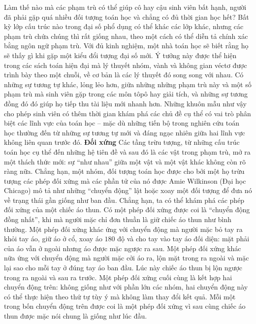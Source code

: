 \begin{multicols}{2}
	\vskip 0.1cm
	Làm thế nào mà các phạm trù có thể giúp cô hay cậu sinh viên bất hạnh, người đã phải gặp quá nhiều đối tượng toán học và chẳng có đủ thời gian học hết? Bất kỳ lớp cấu trúc nào trong đại số phổ dụng có thể khác các lớp khác, nhưng các phạm trù chứa chúng thì rất giống nhau, theo một cách có thể diễn tả chính xác bằng ngôn ngữ phạm trù.
	\vskip 0.1cm
	Với đủ kinh nghiệm, một nhà toán học sẽ biết rằng họ sẽ thấy gì khi gặp một kiểu đổi tượng đại số mới. Ý tưởng này được thể hiện trong các sách toán hiện đại mà lý thuyết nhóm, vành và không gian véctơ được trình bày theo một chuỗi, về cơ bản là các lý thuyết đó song song với nhau. Có những sự tương tự khác, lỏng lẻo hơn, giữa những những phạm trù này và một số phạm trù mà sinh viên gặp trong các môn tôpô hay giải tích, và những sự tương đồng đó đó giúp họ tiếp thu tài liệu mới nhanh hơn. Những khuôn mẫu như vậy cho phép sinh viên có thêm thời gian khám phá các chủ đề cụ thể có vai trò phân biệt các lĩnh vực của toán học -- mặc dù những tiến bộ trong nghiên cứu toán học thường đến từ những sự tương tự mới và đáng ngạc nhiên giữa hai lĩnh vực không liên quan trước đó.
	\vskip 0.1cm
	\textbf{\color{duongvaotoanhoc}Đối xứng}
	\vskip 0.1cm
	Các tầng trừu tượng, từ những cấu trúc toán học cụ thể đến những hệ tiên đề và sau đó là các vật trong phạm trù, mở ra một thách thức mới: sự ``như nhau'' giữa một vật và một vật khác không còn rõ ràng nữa. Chẳng hạn, một nhóm, đối tượng toán học được cho bởi một họ trừu tượng các phép đối xứng mà các phần tử của nó được Amie Wilkinson (Đại học Chicago) mô tả như những ``chuyển động'' lật hoặc xoay một đối tượng để đưa nó về trạng thái gần giống như ban đầu.
	\vskip 0.1cm
	Chẳng hạn, ta có thể khám phá các phép đối xứng của một chiếc áo thun. Có một phép đối xứng được coi là ``chuyển động đồng nhất'', khi mà người mặc chỉ đơn thuần là giữ chiếc áo thun như bình thường. Một phép đối xứng khác ứng với chuyển động mà người mặc bỏ tay ra khỏi tay áo, giữ áo ở cổ, xoay áo $180$ độ và cho tay vào tay áo đối diện: mặt phải của áo vẫn ở ngoài nhưng áo được mặc ngược ra sau. Một phép đối xứng khác nữa ứng với chuyển động mà người mặc cởi áo ra, lộn mặt trong ra ngoài và mặc lại sao cho mỗi tay ở đúng tay áo ban đầu.  Lúc này chiếc áo thun bị lộn ngược trong ra ngoài và sau ra trước. Một phép đối xứng cuối cùng là kết hợp hai chuyển động trên: không giống như với phần lớn các nhóm, hai chuyển động này có thể thực hiện theo thứ tự tùy ý mà không làm thay đổi kết quả. Mỗi một trong bốn chuyển động trên được coi là một phép đối xứng vì sau cùng chiếc áo thun được mặc nói chung là giống như lúc đầu.

\end{multicols}
